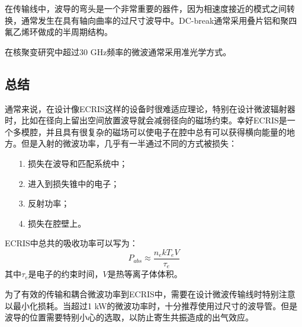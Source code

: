 \documentclass[fontset=windows]{article}
\begin{document}
在传输线中，波导的弯头是一个非常重要的器件，因为相速度接近的模式之间转换，通常发生在具有轴向曲率的过尺寸波导中。DC-break通常采用叠片铝和聚四氟乙烯环做成的半周期结构。

在核聚变研究中超过30 GHz频率的微波通常采用准光学方式。

\subsection{总结}
通常来说，在设计像ECRIS这样的设备时很难适应理论，特别在设计微波辐射器时，比如在径向上留出空间放置波导就会减弱径向的磁场约束。幸好ECRIS是一个多模腔，并且具有很复杂的磁场可以使电子在腔中总有可以获得横向能量的地方。但是入射的微波功率，几乎有一半通过不同的方式被损失：
\begin{enumerate}
    \item [1.]损失在波导和匹配系统中；
    \item [2.]进入到损失锥中的电子；
    \item [3.]反射功率；
    \item [4.]损失在腔壁上。
\end{enumerate}

ECRIS中总共的吸收功率可以写为：
\begin{equation}
    P_{abs}\approx\frac{n_ekT_eV}{\tau_e}
\end{equation}
其中$\tau_e$是电子的约束时间，$V$是热等离子体体积。

为了有效的传输和耦合微波功率到ECRIS中，需要在设计微波传输线时特别注意以最小化损耗。当超过1 kW的微波功率时，十分推荐使用过尺寸的波导管。但是波导的位置需要特别小心的选取，以防止寄生共振造成的出气效应。



\end{document}
